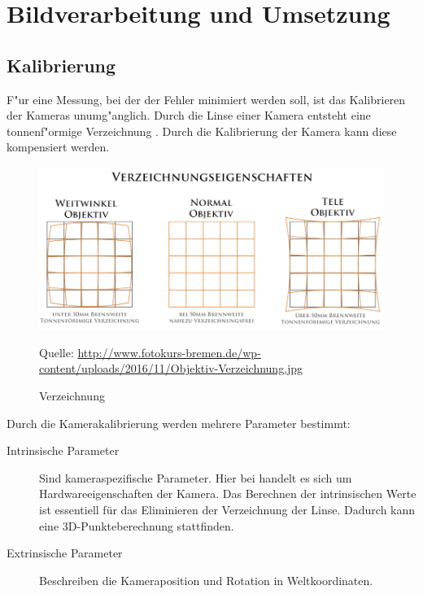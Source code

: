 \chapter{Bildverarbeitung und Umsetzung}
\label{cha:verarbeitungumsetzung}

\section{Kalibrierung}
\label{sec:kalibrierung}

F"ur eine Messung, bei der der Fehler minimiert werden soll, ist das Kalibrieren der Kameras unumg"anglich. Durch die Linse einer Kamera entsteht eine tonnenf"ormige Verzeichnung \cite{VZ}. Durch die Kalibrierung der Kamera kann diese kompensiert werden.\newline

\begin{figure}[H]
	\includegraphics[scale=0.45]{bilder/verzeichnung}
	\caption[Verzeichnung]{Verzeichnung}
	\small Quelle: \url{http://www.fotokurs-bremen.de/wp-content/uploads/2016/11/Objektiv-Verzeichnung.jpg}
\end{figure}

\noindent Durch die Kamerakalibrierung werden mehrere Parameter bestimmt:

\begin{description}
	\item[Intrinsische Parameter]
	Sind kameraspezifische Parameter. Hier bei handelt es sich um Hardwareeigenschaften der Kamera.\newline
	Das Berechnen der intrinsischen Werte ist essentiell für das Eliminieren der Verzeichnung der Linse. Dadurch kann eine 3D-Punkteberechnung stattfinden.
	
	\item[Extrinsische Parameter]
	Beschreiben die Kameraposition und Rotation in Weltkoordinaten.
\end{description}

